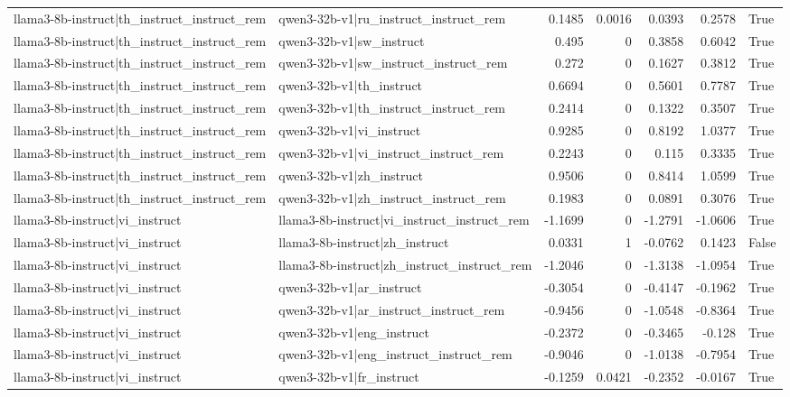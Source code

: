\begin{table}
\begin{tabular}{l l r r r r l}
llama3-8b-instruct|th_instruct_instruct_rem & qwen3-32b-v1|ru_instruct_instruct_rem & 0.1485 & 0.0016 & 0.0393 & 0.2578 & True \\
llama3-8b-instruct|th_instruct_instruct_rem & qwen3-32b-v1|sw_instruct & 0.495 & 0 & 0.3858 & 0.6042 & True \\
llama3-8b-instruct|th_instruct_instruct_rem & qwen3-32b-v1|sw_instruct_instruct_rem & 0.272 & 0 & 0.1627 & 0.3812 & True \\
llama3-8b-instruct|th_instruct_instruct_rem & qwen3-32b-v1|th_instruct & 0.6694 & 0 & 0.5601 & 0.7787 & True \\
llama3-8b-instruct|th_instruct_instruct_rem & qwen3-32b-v1|th_instruct_instruct_rem & 0.2414 & 0 & 0.1322 & 0.3507 & True \\
llama3-8b-instruct|th_instruct_instruct_rem & qwen3-32b-v1|vi_instruct & 0.9285 & 0 & 0.8192 & 1.0377 & True \\
llama3-8b-instruct|th_instruct_instruct_rem & qwen3-32b-v1|vi_instruct_instruct_rem & 0.2243 & 0 & 0.115 & 0.3335 & True \\
llama3-8b-instruct|th_instruct_instruct_rem & qwen3-32b-v1|zh_instruct & 0.9506 & 0 & 0.8414 & 1.0599 & True \\
llama3-8b-instruct|th_instruct_instruct_rem & qwen3-32b-v1|zh_instruct_instruct_rem & 0.1983 & 0 & 0.0891 & 0.3076 & True \\
llama3-8b-instruct|vi_instruct & llama3-8b-instruct|vi_instruct_instruct_rem & -1.1699 & 0 & -1.2791 & -1.0606 & True \\
llama3-8b-instruct|vi_instruct & llama3-8b-instruct|zh_instruct & 0.0331 & 1 & -0.0762 & 0.1423 & False \\
llama3-8b-instruct|vi_instruct & llama3-8b-instruct|zh_instruct_instruct_rem & -1.2046 & 0 & -1.3138 & -1.0954 & True \\
llama3-8b-instruct|vi_instruct & qwen3-32b-v1|ar_instruct & -0.3054 & 0 & -0.4147 & -0.1962 & True \\
llama3-8b-instruct|vi_instruct & qwen3-32b-v1|ar_instruct_instruct_rem & -0.9456 & 0 & -1.0548 & -0.8364 & True \\
llama3-8b-instruct|vi_instruct & qwen3-32b-v1|eng_instruct & -0.2372 & 0 & -0.3465 & -0.128 & True \\
llama3-8b-instruct|vi_instruct & qwen3-32b-v1|eng_instruct_instruct_rem & -0.9046 & 0 & -1.0138 & -0.7954 & True \\
llama3-8b-instruct|vi_instruct & qwen3-32b-v1|fr_instruct & -0.1259 & 0.0421 & -0.2352 & -0.0167 & True \\

\end{tabular}
\end{table}
